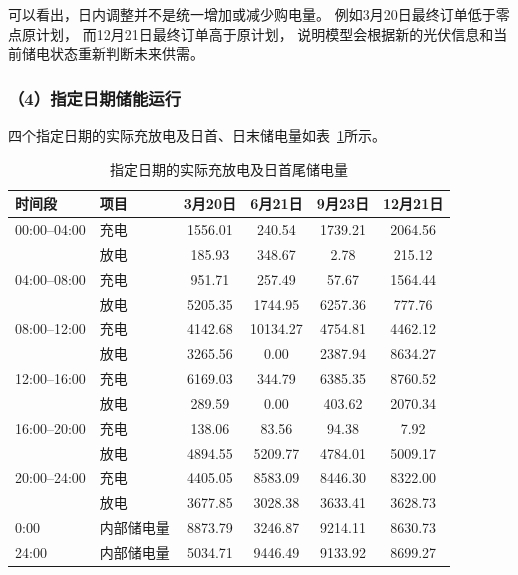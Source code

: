 可以看出，日内调整并不是统一增加或减少购电量。
例如3月20日最终订单低于零点原计划，
而12月21日最终订单高于原计划，
说明模型会根据新的光伏信息和当前储电状态重新判断未来供需。


\subsubsection*{（4）指定日期储能运行}

四个指定日期的实际充放电及日首、日末储电量如表~\ref{tab:q3_storage}所示。

\begin{table}[htbp]
\centering
\caption{指定日期的实际充放电及日首尾储电量}
\label{tab:q3_storage}
\begin{tabular}{llcccc}
\hline
时间段 & 项目
& 3月20日
& 6月21日
& 9月23日
& 12月21日 \\
\hline
00:00--04:00 & 充电 & 1556.01 & 240.54  & 1739.21 & 2064.56 \\
              & 放电 & 185.93  & 348.67  & 2.78    & 215.12 \\

04:00--08:00 & 充电 & 951.71  & 257.49  & 57.67   & 1564.44 \\
              & 放电 & 5205.35 & 1744.95 & 6257.36 & 777.76 \\

08:00--12:00 & 充电 & 4142.68 & 10134.27 & 4754.81 & 4462.12 \\
              & 放电 & 3265.56 & 0.00     & 2387.94 & 8634.27 \\

12:00--16:00 & 充电 & 6169.03 & 344.79  & 6385.35 & 8760.52 \\
              & 放电 & 289.59  & 0.00    & 403.62  & 2070.34 \\

16:00--20:00 & 充电 & 138.06  & 83.56   & 94.38   & 7.92 \\
              & 放电 & 4894.55 & 5209.77 & 4784.01 & 5009.17 \\

20:00--24:00 & 充电 & 4405.05 & 8583.09 & 8446.30 & 8322.00 \\
              & 放电 & 3677.85 & 3028.38 & 3633.41 & 3628.73 \\
\hline
0:00  & 内部储电量 & 8873.79 & 3246.87 & 9214.11 & 8630.73 \\
24:00 & 内部储电量 & 5034.71 & 9446.49 & 9133.92 & 8699.27 \\
\hline
\end{tabular}
\end{table}

